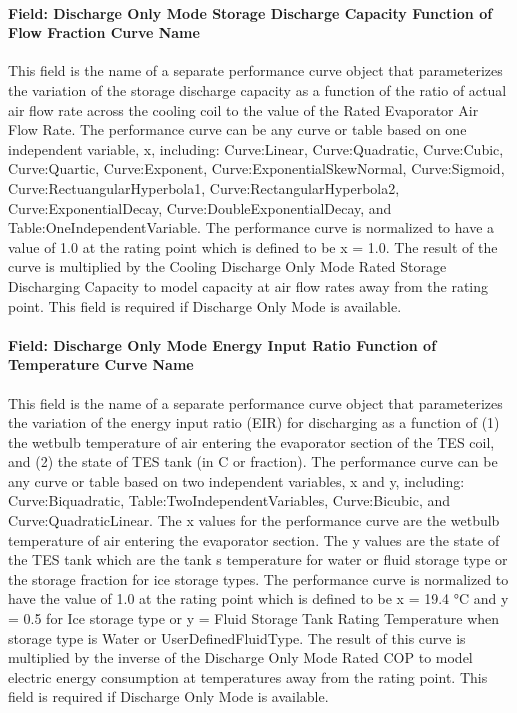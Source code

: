 \paragraph{Field: Discharge Only Mode Storage Discharge Capacity Function of Flow Fraction Curve Name}\label{field-discharge-only-mode-storage-discharge-capacity-function-of-flow-fraction-curve-name}

This field is the name of a separate performance curve object that parameterizes the variation of the storage discharge capacity as a function of the ratio of actual air flow rate across the cooling coil to the value of the Rated Evaporator Air Flow Rate. The performance curve can be any curve or table based on one independent variable, x, including: Curve:Linear, Curve:Quadratic, Curve:Cubic, Curve:Quartic, Curve:Exponent, Curve:ExponentialSkewNormal, Curve:Sigmoid, Curve:RectuangularHyperbola1, Curve:RectangularHyperbola2, Curve:ExponentialDecay, Curve:DoubleExponentialDecay, and Table:OneIndependentVariable. The performance curve is normalized to have a value of 1.0 at the rating point which is defined to be x = 1.0. The result of the curve is multiplied by the Cooling Discharge Only Mode Rated Storage Discharging Capacity to model capacity at air flow rates away from the rating point. This field is required if Discharge Only Mode is available.

\paragraph{Field: Discharge Only Mode Energy Input Ratio Function of Temperature Curve Name}\label{field-discharge-only-mode-energy-input-ratio-function-of-temperature-curve-name}

This field is the name of a separate performance curve object that parameterizes the variation of the energy input ratio (EIR) for discharging as a function of (1) the wetbulb temperature of air entering the evaporator section of the TES coil, and (2) the state of TES tank (in C or fraction). The performance curve can be any curve or table based on two independent variables, x and y, including: Curve:Biquadratic, Table:TwoIndependentVariables, Curve:Bicubic, and Curve:QuadraticLinear. The x values for the performance curve are the wetbulb temperature of air entering the evaporator section. The y values are the state of the TES tank which are the tank s temperature for water or fluid storage type or the storage fraction for ice storage types. The performance curve is normalized to have the value of 1.0 at the rating point which is defined to be x = 19.4 °C and y = 0.5 for Ice storage type or y = Fluid Storage Tank Rating Temperature when storage type is Water or UserDefinedFluidType. The result of this curve is multiplied by the inverse of the Discharge Only Mode Rated COP to model electric energy consumption at temperatures away from the rating point. This field is required if Discharge Only Mode is available.

